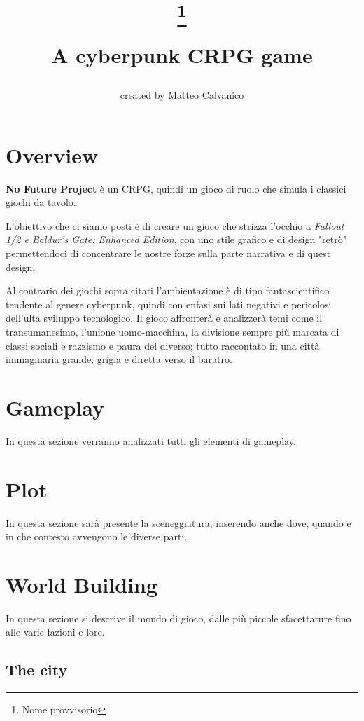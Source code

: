 \documentclass[11pt, oneside]{article}
\title{
        
    \textbf{\projectName}
    \thanks{Nome provvisorio}

    \large A cyberpunk CRPG game
}
\author{created by Matteo Calvanico}
\date{}
\newcommand{\projectName}{No Future Project}
\begin{document}
\maketitle

\pagebreak
\section{Overview}
\textbf{\projectName} è un CRPG, quindi un gioco di ruolo che simula i classici giochi da tavolo.

L'obiettivo che ci siamo posti è di creare un gioco che strizza l'occhio a \textit{Fallout 1/2 e Baldur's Gate: Enhanced Edition}, con uno stile grafico e di design "retrò" permettendoci di concentrare le nostre forze sulla parte narrativa e di quest design.

Al contrario dei giochi sopra citati l'ambientazione è di tipo fantascientifico tendente al genere cyberpunk, quindi con enfasi sui lati negativi e pericolosi dell'ulta sviluppo tecnologico.
Il gioco affronterà e analizzerà temi come il transumanesimo, l'unione uomo-macchina, la divisione sempre più marcata di classi sociali e razzismo e paura del diverso; tutto raccontato in una città immaginaria grande, grigia e diretta verso il baratro.



\section{Gameplay}
In questa sezione verranno analizzati tutti gli elementi di gameplay.
\pagebreak %

\section{Plot}
In questa sezione sarà presente la sceneggiatura, inserendo anche dove, quando e in che contesto avvengono le diverse parti.
\pagebreak %

\section{World Building}
In questa sezione si descrive il mondo di gioco, dalle più piccole sfacettature fino alle varie fazioni e lore.
\subsection{The city}
\end{document}

